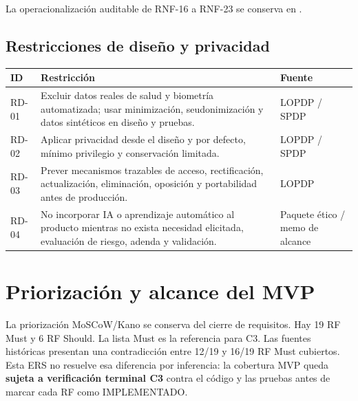 \documentclass[11pt,a4paper,twoside]{article}
\begin{document}
La operacionalización auditable de RNF-16 a RNF-23 se conserva en .

\subsection{Restricciones de diseño y privacidad}
\begin{tabularx}{\textwidth}{p{2.5cm}X p{3.2cm}}\toprule
ID & Restricción & Fuente \\ \midrule
RD-01 & Excluir datos reales de salud y biometría automatizada; usar minimización, seudonimización y datos sintéticos en diseño y pruebas. & LOPDP / SPDP \\
RD-02 & Aplicar privacidad desde el diseño y por defecto, mínimo privilegio y conservación limitada. & LOPDP / SPDP \\
RD-03 & Prever mecanismos trazables de acceso, rectificación, actualización, eliminación, oposición y portabilidad antes de producción. & LOPDP \\
RD-04 & No incorporar IA o aprendizaje automático al producto mientras no exista necesidad elicitada, evaluación de riesgo, adenda y validación. & Paquete ético / memo de alcance \\
\bottomrule\end{tabularx}

\section{Priorización y alcance del MVP}
La priorización MoSCoW/Kano se conserva del cierre de requisitos. Hay 19 RF Must y 6 RF Should. La lista Must es la referencia para C3. Las fuentes históricas presentan una contradicción entre 12/19 y 16/19 RF Must cubiertos. Esta ERS no resuelve esa diferencia por inferencia: la cobertura MVP queda \textbf{sujeta a verificación terminal C3} contra el código y las pruebas antes de marcar cada RF como IMPLEMENTADO.
\end{document}
